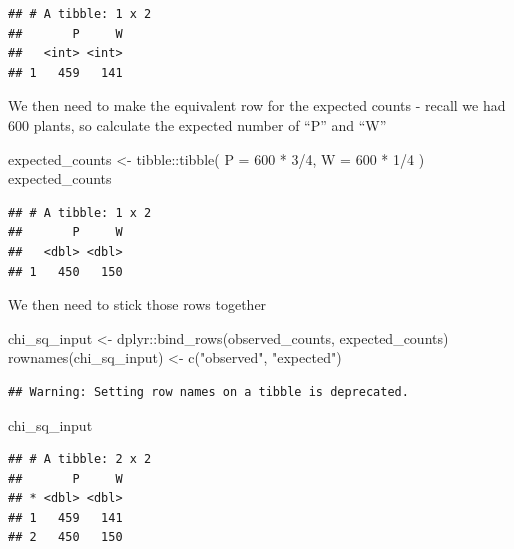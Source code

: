 \documentclass[
]{book}
\newenvironment{Shaded}{\begin{snugshade}}{\end{snugshade}}
\newcommand{\AttributeTok}[1]{\textcolor[rgb]{0.77,0.63,0.00}{#1}}
\newcommand{\DecValTok}[1]{\textcolor[rgb]{0.00,0.00,0.81}{#1}}
\newcommand{\FunctionTok}[1]{\textcolor[rgb]{0.00,0.00,0.00}{#1}}
\newcommand{\NormalTok}[1]{#1}
\newcommand{\OtherTok}[1]{\textcolor[rgb]{0.56,0.35,0.01}{#1}}
\newcommand{\SpecialCharTok}[1]{\textcolor[rgb]{0.00,0.00,0.00}{#1}}
\newcommand{\StringTok}[1]{\textcolor[rgb]{0.31,0.60,0.02}{#1}}
\begin{document}
\begin{verbatim}
## # A tibble: 1 x 2
##       P     W
##   <int> <int>
## 1   459   141
\end{verbatim}

We then need to make the equivalent row for the expected counts - recall we had 600 plants, so calculate the expected number of ``P'' and ``W''

\begin{Shaded}
\begin{Highlighting}[]
\NormalTok{expected\_counts }\OtherTok{\textless{}{-}}\NormalTok{ tibble}\SpecialCharTok{::}\FunctionTok{tibble}\NormalTok{(}
   \AttributeTok{P =} \DecValTok{600} \SpecialCharTok{*} \DecValTok{3}\SpecialCharTok{/}\DecValTok{4}\NormalTok{,}
   \AttributeTok{W =}  \DecValTok{600} \SpecialCharTok{*} \DecValTok{1}\SpecialCharTok{/}\DecValTok{4}
\NormalTok{)}
\NormalTok{expected\_counts}
\end{Highlighting}
\end{Shaded}

\begin{verbatim}
## # A tibble: 1 x 2
##       P     W
##   <dbl> <dbl>
## 1   450   150
\end{verbatim}

We then need to stick those rows together

\begin{Shaded}
\begin{Highlighting}[]
\NormalTok{chi\_sq\_input }\OtherTok{\textless{}{-}}\NormalTok{ dplyr}\SpecialCharTok{::}\FunctionTok{bind\_rows}\NormalTok{(observed\_counts, expected\_counts)}
\FunctionTok{rownames}\NormalTok{(chi\_sq\_input) }\OtherTok{\textless{}{-}} \FunctionTok{c}\NormalTok{(}\StringTok{"observed"}\NormalTok{, }\StringTok{"expected"}\NormalTok{)}
\end{Highlighting}
\end{Shaded}

\begin{verbatim}
## Warning: Setting row names on a tibble is deprecated.
\end{verbatim}

\begin{Shaded}
\begin{Highlighting}[]
\NormalTok{chi\_sq\_input}
\end{Highlighting}
\end{Shaded}

\begin{verbatim}
## # A tibble: 2 x 2
##       P     W
## * <dbl> <dbl>
## 1   459   141
## 2   450   150
\end{verbatim}
\end{document}
